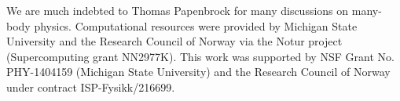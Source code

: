\begin{acknowledgement}
We are much indebted to Thomas Papenbrock for many discussions on many-body physics.
Computational resources were provided by Michigan State University and the Research Council of Norway via the Notur project (Supercomputing grant NN2977K).
This work was supported by NSF Grant No. PHY-1404159 (Michigan State University)  and  the Research Council of Norway under contract ISP-Fysikk/216699.
\end{acknowledgement}










 



\documentclass[compress]{beamer}




{
  \usepackage{beamerbasearticle}
  \usepackage{fullpage}
  \usepackage{hyperref}
}


\beamertemplatetransparentcovereddynamic

[page number]



\usepackage{ucs}


\usepackage{pgf,pgfarrows,pgfnodes,pgfautomata,pgfheaps,pgfshade}
\usepackage{graphicx}
\usepackage{simplewick}
\usepackage{amsmath,amssymb}
\usepackage[latin1]{inputenc}
\usepackage{colortbl}
\usepackage[english]{babel}
\usepackage{listings}
\usepackage{shadow}
\lstset{language=c++}
\lstset{alsolanguage=[90]Fortran}
\lstset{basicstyle=\small}
\lstset{stringstyle=\ttfamily}
\lstset{showspaces=false}
\lstset{showstringspaces=false}
\lstset{showtabs=false}
\lstset{breaklines}
\usepackage{times}

